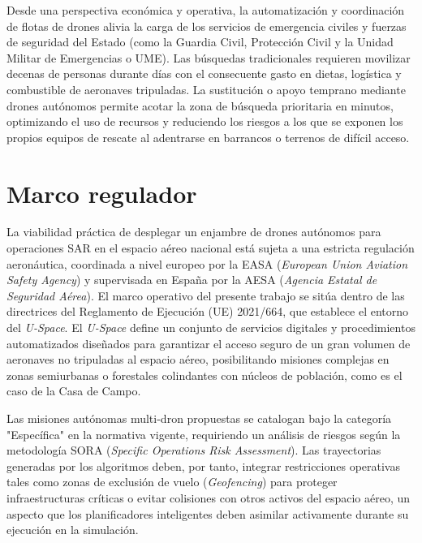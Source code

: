 Desde una perspectiva económica y operativa, la automatización y coordinación de flotas de drones alivia la carga de los servicios de emergencia civiles y fuerzas de seguridad del Estado (como la Guardia Civil, Protección Civil y la Unidad Militar de Emergencias o UME). Las búsquedas tradicionales requieren movilizar decenas de personas durante días con el consecuente gasto en dietas, logística y combustible de aeronaves tripuladas. La sustitución o apoyo temprano mediante drones autónomos permite acotar la zona de búsqueda prioritaria en minutos, optimizando el uso de recursos y reduciendo los riesgos a los que se exponen los propios equipos de rescate al adentrarse en barrancos o terrenos de difícil acceso.

\section{Marco regulador}
La viabilidad práctica de desplegar un enjambre de drones autónomos para operaciones SAR en el espacio aéreo nacional está sujeta a una estricta regulación aeronáutica, coordinada a nivel europeo por la EASA (\textit{European Union Aviation Safety Agency}) y supervisada en España por la AESA (\textit{Agencia Estatal de Seguridad Aérea}). El marco operativo del presente trabajo se sitúa dentro de las directrices del Reglamento de Ejecución (UE) 2021/664, que establece el entorno del \textit{U-Space}. El \textit{U-Space} define un conjunto de servicios digitales y procedimientos automatizados diseñados para garantizar el acceso seguro de un gran volumen de aeronaves no tripuladas al espacio aéreo, posibilitando misiones complejas en zonas semiurbanas o forestales colindantes con núcleos de población, como es el caso de la Casa de Campo.

Las misiones autónomas multi-dron propuestas se catalogan bajo la categoría "Específica" en la normativa vigente, requiriendo un análisis de riesgos según la metodología SORA (\textit{Specific Operations Risk Assessment}). Las trayectorias generadas por los algoritmos deben, por tanto, integrar restricciones operativas tales como zonas de exclusión de vuelo (\textit{Geofencing}) para proteger infraestructuras críticas o evitar colisiones con otros activos del espacio aéreo, un aspecto que los planificadores inteligentes deben asimilar activamente durante su ejecución en la simulación.

